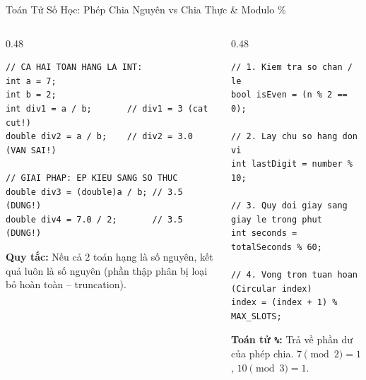 \documentclass[aspectratio=169, 10pt]{beamer}
\begin{document}
\begin{frame}[fragile]{Toán Tử Số Học: Phép Chia Nguyên vs Chia Thực \& Modulo \%}
  \begin{columns}[T]
    \begin{column}{0.48\textwidth}
      \begin{tcolorbox}[colback=AlertRed!10,colframe=AlertRed,title=\textbf{Cạm bẫy tử huyệt: Phép chia số nguyên},fonttitle=\small\bfseries]
\begin{lstlisting}[numbers=none]
// CA HAI TOAN HANG LA INT:
int a = 7;
int b = 2;
int div1 = a / b;       // div1 = 3 (cat cut!)
double div2 = a / b;    // div2 = 3.0 (VAN SAI!)

// GIAI PHAP: EP KIEU SANG SO THUC
double div3 = (double)a / b; // 3.5 (DUNG!)
double div4 = 7.0 / 2;       // 3.5 (DUNG!)
\end{lstlisting}
        \footnotesize \textbf{Quy tắc:} Nếu cả 2 toán hạng là số nguyên, kết quả luôn là số nguyên (phần thập phân bị loại bỏ hoàn toàn -- truncation).
      \end{tcolorbox}
    \end{column}

    \begin{column}{0.48\textwidth}
      \begin{tcolorbox}[colback=UniGreen!10,colframe=UniGreen,title=\textbf{Ứng dụng thực tế của Modulo (\%)},fonttitle=\small\bfseries]
\begin{lstlisting}[numbers=none]
// 1. Kiem tra so chan / le
bool isEven = (n % 2 == 0);

// 2. Lay chu so hang don vi
int lastDigit = number % 10;

// 3. Quy doi giay sang giay le trong phut
int seconds = totalSeconds % 60;

// 4. Vong tron tuan hoan (Circular index)
index = (index + 1) % MAX_SLOTS;
\end{lstlisting}
        \footnotesize \textbf{Toán tử \texttt{\%}:} Trả về phần dư của phép chia. $7 \pmod 2 = 1$, $10 \pmod 3 = 1$.
      \end{tcolorbox}
    \end{column}
  \end{columns}
\end{frame}
\end{document}
